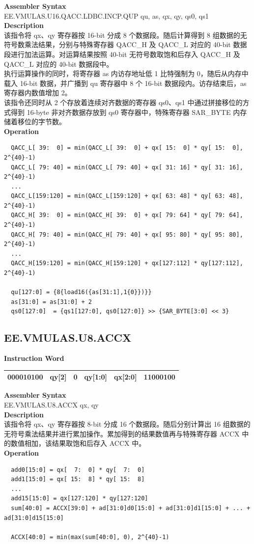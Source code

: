 \textbf{Assembler Syntax} \\
EE.VMULAS.U16.QACC.LDBC.INCP.QUP qu, as, qx, qy, qs0, qs1 \\
\textbf{Description} \\
该指令将 qx、qy 寄存器按 16-bit 分成 8 个数据段。随后计算得到 8 组数据的无符号数乘法结果，分别与特殊寄存器 QACC\_H 及 QACC\_L 对应的 40-bit 数据段进行加法运算。对运算结果按照 40-bit 无符号数取饱和后存入 QACC\_H 及 QACC\_L 对应的 40-bit 数据段中。\\
执行运算操作的同时，将寄存器 as 内访存地址低 1 比特强制为 0，随后从内存中载入 16-bit 数据，并广播到 qu 寄存器中 8 个 16-bit 数据段内。访存结束后，as 寄存器内数值增加 2。\\
该指令还同时从 2 个存放着连续对齐数据的寄存器 qs0、qs1 中通过拼接移位的方式得到 16-byte 非对齐数据存放到 qs0 寄存器中，特殊寄存器 SAR\_BYTE 内存储着移位的字节数。\\
\textbf{Operation}
\begin{lstlisting}
  QACC_L[ 39:  0] = min(QACC_L[ 39:  0] + qx[ 15:  0] * qy[ 15:  0], 2^{40}-1)
  QACC_L[ 79: 40] = min(QACC_L[ 79: 40] + qx[ 31: 16] * qy[ 31: 16], 2^{40}-1)
  ...
  QACC_L[159:120] = min(QACC_L[159:120] + qx[ 63: 48] * qy[ 63: 48], 2^{40}-1)
  QACC_H[ 39:  0] = min(QACC_H[ 39:  0] + qx[ 79: 64] * qy[ 79: 64], 2^{40}-1)
  QACC_H[ 79: 40] = min(QACC_H[ 79: 40] + qx[ 95: 80] * qy[ 95: 80], 2^{40}-1)
  ...
  QACC_H[159:120] = min(QACC_H[159:120] + qx[127:112] * qy[127:112], 2^{40}-1)

  qu[127:0] = {8{load16({as[31:1],1{0}})}}
  as[31:0] = as[31:0] + 2
  qs0[127:0]  = {qs1[127:0], qs0[127:0]} >> {SAR_BYTE[3:0] << 3}
\end{lstlisting}

\clearpage
\subsection{EE.VMULAS.U8.ACCX}\label{instruction:EEVMULASU8ACCX}
\setlength\tabcolsep{6pt}
\textbf{Instruction Word} \\
\begin{tabular}{|c|c|c|c|c|c|}
	\hline
	000010100 & qy[2] & 0 & qy[1:0] & qx[2:0] & 11000100 \\
	\hline
\end{tabular}

\textbf{Assembler Syntax} \\
EE.VMULAS.U8.ACCX qx, qy \\
\textbf{Description} \\
该指令将 qx、qy 寄存器按 8-bit 分成 16 个数据段。随后分别计算出 16 组数据的无符号乘法结果并进行累加操作。累加得到的结果数值再与特殊寄存器 ACCX 中的数值相加，该结果取饱和后存入 ACCX 中。\\
\textbf{Operation}
\begin{lstlisting}
  add0[15:0] = qx[  7:  0] * qy[  7:  0]
  add1[15:0] = qx[ 15:  8] * qy[ 15:  8]
  ...
  add15[15:0] = qx[127:120] * qy[127:120]
  sum[40:0] = ACCX[39:0] + ad[31:0]d0[15:0] + ad[31:0]d1[15:0] + ... + ad[31:0]d15[15:0]

  ACCX[40:0] = min(max(sum[40:0], 0), 2^{40}-1)
\end{lstlisting}

